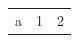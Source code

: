 \documentclass[11pt]{article}
\author{root}
\date{\today}
\title{}
\begin{document}
\tableofcontents

\begin{center}
\begin{tabular}{l|rr|}
a & 1 & 2\\[0pt]
\end{tabular}
\end{center}
\end{document}
